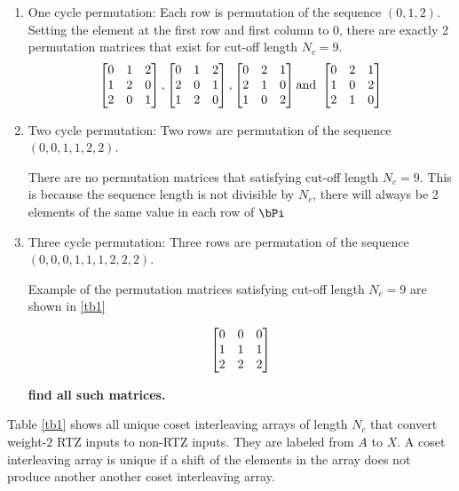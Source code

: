 \documentclass[11pt, oneside, dvipdfmx]{book}
\begin{document}
\begin{enumerate}
	\item One cycle permutation: Each row is permutation of the sequence $(0,1,2)$. Setting the element at the first row and first column to $0$, there are exactly 2 permutation matrices that exist for cut-off length $N_c = 9$.
	\begin{equation}
	\begin{bmatrix}
	0 & 1 & 2\cr
	1 & 2 & 0\cr
	2 & 0 & 1
	\end{bmatrix}
	,
	\begin{bmatrix}
	0 & 1 & 2\cr
	2 & 0 & 1\cr
	1 & 2 & 0
	\end{bmatrix}
	,
	\begin{bmatrix}
	0 & 2 & 1\cr
	2 & 1 & 0\cr
	1 & 0 & 2
	\end{bmatrix}
	\text{and }
	\begin{bmatrix}
	0 & 2 & 1\cr
	1 & 0 & 2\cr
	2 & 1 & 0
	\end{bmatrix}
	\end{equation}
	
	
	\item Two cycle permutation: Two rows are permutation of the sequence $(0,0,1,1,2,2)$.
	
	There are no permutation matrices that satisfying cut-off length $N_c = 9$. This is because the sequence length is not divisible by $N_c$, there will always be 2 elements of the same value in each row of $\bPi$
	
	
	\item Three cycle permutation: Three rows are permutation of the sequence$(0,0,0,1,1,1,2,2,2)$. 
	
	Example of the permutation matrices satisfying cut-off length $N_c = 9$ are shown in \ref{tb1}
	
	\begin{eqnarray}
	\begin{bmatrix}
	0 & 0 & 0\cr
	1 & 1 & 1\cr
	2 & 2 & 2
	\end{bmatrix}
	\label{Eq:2}
	\end{eqnarray}
	
	{\bf find all such matrices.}
\end{enumerate}





Table \ref{tb1} shows all unique coset interleaving arrays of length $N_c$ that convert weight-$2$ RTZ inputs to non-RTZ inputs. They are labeled from $A$ to $X$. A coset interleaving array is unique if a shift of the elements in the array does not produce another another coset interleaving array.
\end{document}

